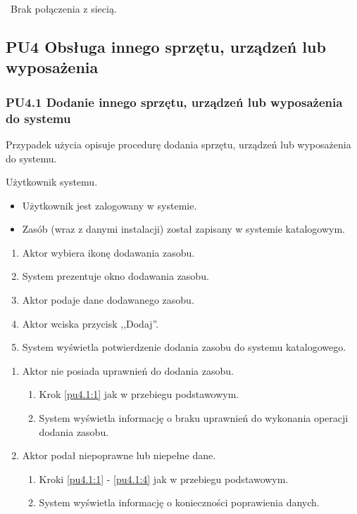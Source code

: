 \
Brak połączenia z siecią.

\subsection{PU4 Obsługa innego sprzętu, urządzeń lub wyposażenia} \label{pu4}
\subsubsection{PU4.1 Dodanie innego sprzętu, urządzeń lub wyposażenia do systemu}

Przypadek użycia opisuje procedurę dodania sprzętu, urządzeń lub wyposażenia do systemu.

Użytkownik systemu.

\begin{itemize}
\item Użytkownik jest zalogowany w systemie.
\end{itemize}

\begin{itemize}
\item Zasób (wraz z danymi instalacji) został zapisany w systemie katalogowym.
\end{itemize}

\begin{enumerate}
\item \label{pu4.1:1} Aktor wybiera ikonę dodawania zasobu.
\item System prezentuje okno dodawania zasobu.
\item Aktor podaje dane dodawanego zasobu.
\item \label{pu4.1:4} Aktor wciska przycisk ,,Dodaj''.
\item System wyświetla potwierdzenie dodania zasobu do systemu katalogowego.
\end{enumerate}

\begin{enumerate}
\item Aktor nie posiada uprawnień do dodania zasobu.
	\begin{enumerate}[label*=\arabic*.]
		\item Krok \ref{pu4.1:1} jak w przebiegu podstawowym.
		\item System wyświetla informację o braku uprawnień do wykonania operacji dodania zasobu.
	\end{enumerate}
\item Aktor podał niepoprawne lub niepełne dane.
	\begin{enumerate}[label*=\arabic*.]
		\item Kroki \ref{pu4.1:1} - \ref{pu4.1:4} jak w przebiegu podstawowym.
		\item System wyświetla informację o konieczności poprawienia danych.
	\end{enumerate}
\end{enumerate}

